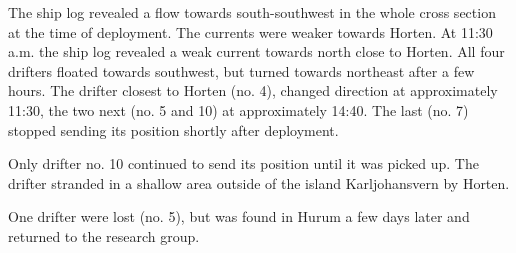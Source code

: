 \documentclass[12pt,a4paper,english]{article}
\begin{document}
The ship log revealed a flow towards south-southwest in the whole cross section at the time of deployment. The currents were weaker towards Horten. At 11:30 a.m. the ship log revealed a weak current towards north close to Horten. All four drifters floated towards southwest, but turned towards northeast after a few hours. The drifter closest to Horten (no. 4), changed direction at approximately 11:30, the two next (no. 5 and 10) at approximately 14:40. The last (no. 7) stopped sending its position shortly after deployment.

Only drifter no. 10 continued to send its position until it was picked up. The drifter stranded in a shallow area outside of the island Karljohansvern by Horten.

One drifter were lost (no. 5), but was found in Hurum a few days later and returned to the research group.

\end{document}

